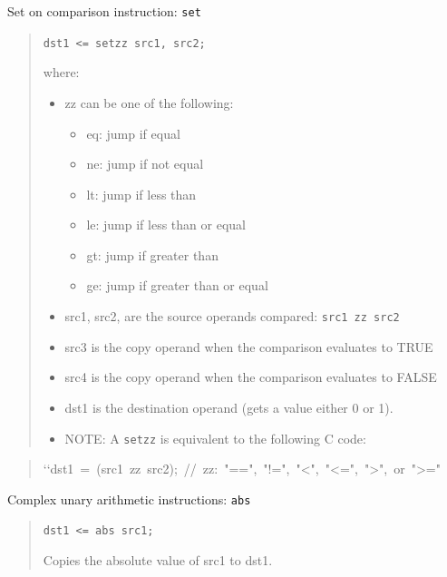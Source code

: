 \documentclass[a4paper]{article}
\begin{document}
Set on comparison instruction: \texttt{set}
%
\begin{quote}

\texttt{dst1 <= setzz src1, src2;}

where:
%
\begin{itemize}

\item zz can be one of the following:
%
\begin{itemize}

\item eq: jump if equal

\item ne: jump if not equal

\item lt: jump if less than

\item le: jump if less than or equal

\item gt: jump if greater than

\item ge: jump if greater than or equal

\end{itemize}

\item src1, src2, are the source operands compared: \texttt{src1 zz src2}

\item src3 is the copy operand when the comparison evaluates to TRUE

\item src4 is the copy operand when the comparison evaluates to FALSE

\item dst1 is the destination operand (gets a value either 0 or 1).

\item NOTE: A \texttt{setzz} is equivalent to the following C code:

\end{itemize}

\end{quote}
%
\begin{quote}{\ttfamily \raggedright \noindent
`{}`dst1~=~(src1~zz~src2);~//~zz:~"==",~"!=",~"<",~"<=",~">",~or~">="
}
\end{quote}

Complex unary arithmetic instructions: \texttt{abs}
%
\begin{quote}

\texttt{dst1 <= abs src1;}

Copies the absolute value of src1 to dst1.

\end{quote}
\end{document}
